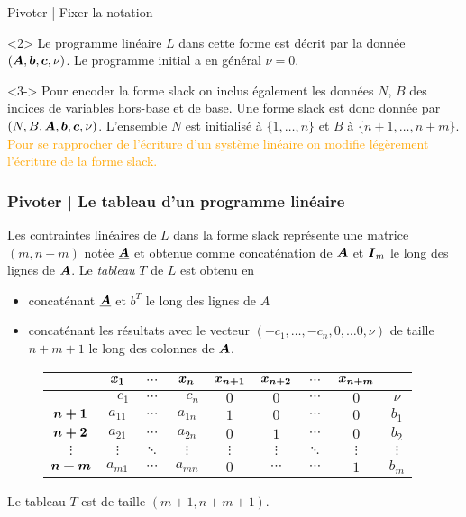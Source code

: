 \documentclass[aspectratio = 169]{beamer}
\begin{document}
\begin{frame}{Pivoter | Fixer la notation}
\begin{overlayarea}{\textwidth}{.3\textheight}
        \begin{onlyenv}<2> Le programme linéaire $L$ dans cette forme
          est décrit par la donnée $(\boldsymbol{A}, \boldsymbol{b}, \boldsymbol{c},
          \nu)$. Le programme initial a en général $\nu = 0$.
        \end{onlyenv}
        \begin{onlyenv}<3-> Pour encoder la forme slack on inclus
          également les données $N$, $B$ des indices de variables
          hors-base et de base. Une forme slack est donc donnée par
          $(N, B, \boldsymbol{A}, \boldsymbol{b}, \boldsymbol{c}, \nu)$. L'ensemble $N$ est
          initialisé à $\{1, \ldots, n\}$ et $B$ à
          $\{n+1, \ldots, n+m\}$. \pause[4] \textcolor{orange}{Pour se
            rapprocher de l'écriture d'un système linéaire on modifie
            légèrement l'écriture de la forme slack.}
        \end{onlyenv}
    \end{overlayarea}
\end{frame}

\begin{frame}
  \frametitle{Pivoter | Le tableau d'un programme linéaire}
  Les contraintes linéaires de $L$ dans la forme slack représente une
  matrice $(m, n+m)$ notée $\underline{\boldsymbol{A}}$ et obtenue comme
  concaténation de $\boldsymbol{A}$ et $\boldsymbol{I}_m$ le long des lignes de
  $\boldsymbol{A}$. Le \emph{tableau} $T$ de $L$ est obtenu en
  \begin{itemize}
  \item<2-> concaténant $\underline{\boldsymbol{A}}$ et $b^T$ le long des
    lignes de $A$
  \item<3-> concaténant les résultats avec le vecteur
    $(-c_1, \ldots, -c_n, 0, \ldots 0, \nu)$ de taille $n+m+1$ le long
    des colonnes de $\boldsymbol{A}$.
  \end{itemize}
  \pause[4]
  \begin{figure}
    \begin{tabular}{c|ccc|cccc|c|}
       & \alert{$\boldsymbol{x_1}$} & \alert{$\cdots$} & \alert{$\boldsymbol{x_n}$} & \alert{$\boldsymbol{x_{n+1}}$} & \alert{$\boldsymbol{x_{n+2}}$} & \alert{$\cdots$} & \alert{$\boldsymbol{x_{n+m}}$} &  \\
      \hline
       & $-c_1$ & $\cdots$ & $-c_n$ & $0$ & $0$ & $\cdots$ & $0$ & $\nu$ \\
      \hline
      \alert{$\boldsymbol{n+1}$} & $a_{11}$ & $\cdots$ & $a_{1n}$ & $1$ & $0$ & $\cdots$ & $0$ & $b_1$ \\
      \alert{$\boldsymbol{n+2}$}& $a_{21}$ & $\cdots$ & $a_{2n}$ & $0$ & $1$ & $\cdots$ & $0$ & $b_2$ \\
      \alert{$\vdots$}& $\vdots$ & $\ddots$ & $\vdots$ & $\vdots$ & $\vdots$ & $\ddots$ & $\vdots$ & $\vdots$ \\
      \alert{$\boldsymbol{n+m}$} & $a_{m1}$ & $\cdots$  & $a_{mn}$  & $0$ & $\cdots$ & $\cdots$ & $1$ & $b_m$
    \end{tabular}
  \end{figure}
  Le tableau $T$ est de taille $(m + 1, n + m + 1)$.
\end{frame}
\end{document}
